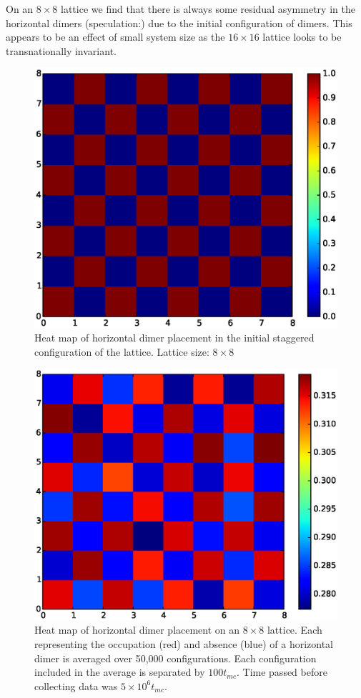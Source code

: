 \documentclass[aps,floatfix,11pt]{revtex4-1}
\begin{document}
On an $8\times 8$ lattice we find that there is always some residual asymmetry in the horizontal
dimers (speculation:) due to the initial configuration of dimers. This appears to be an effect of
small system size as the $16\times 16$ lattice looks to be transnationally invariant.

\begin{figure}[h]
    \centering
    \includegraphics[width=8.5 cm]{grey_scale_init_config_horz}
    \caption{Heat map of horizontal dimer placement in the initial staggered configuration of the
    lattice. Lattice size: $8\times 8$ \label{fig:horz_init_heat}}
\end{figure}


\begin{figure}[h]
    \centering
    \includegraphics[width=8.5 cm]{grey_scale_avg_horz}
    \caption{Heat map of horizontal dimer placement on an $8\times 8$ lattice. Each representing the
        occupation (red) and absence (blue) of a horizontal dimer is averaged over 50,000 configurations. Each
        configuration included in the average is separated by $100t_{mc}$. Time passed before
        collecting data was $5\times 10^6 t_{mc}$.  \label{fig:horz_avg_heat}}
\end{figure}
\end{document}
